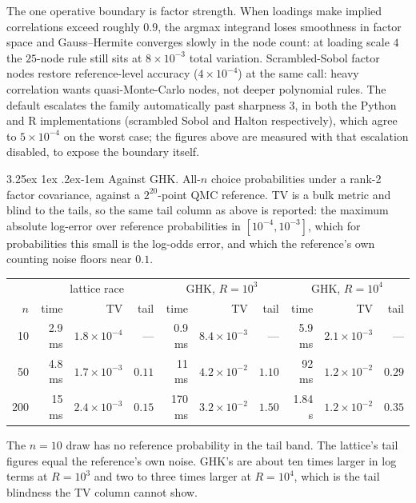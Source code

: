 \documentclass[11pt]{article}
\makeatletter
\renewcommand\paragraph{\@startsection{paragraph}{4}{\z@}%
  {3.25ex \@plus1ex \@minus.2ex}{-1em}%
  {\normalfont\normalsize\itshape}}
\makeatother
\begin{document}
The one operative boundary is factor strength. When loadings make implied
correlations exceed roughly $0.9$, the argmax integrand loses smoothness in
factor space and Gauss--Hermite converges slowly in the node count: at
loading scale $4$ the $25$-node rule still sits at $8\times10^{-3}$ total
variation. Scrambled-Sobol factor nodes restore reference-level accuracy
($4\times10^{-4}$) at the same call: heavy correlation wants
quasi-Monte-Carlo nodes, not deeper polynomial rules. The default
escalates the family automatically past sharpness $3$, in both the Python
and R implementations (scrambled Sobol and Halton respectively), which
agree to $5\times10^{-4}$ on the worst case; the figures above are
measured with that escalation disabled, to expose the boundary itself.

\paragraph{Against GHK.} All-$n$ choice probabilities under a rank-2 factor
covariance, against a $2^{20}$-point QMC reference. TV is a bulk metric and
blind to the tails, so the same tail column as above is reported: the
maximum absolute log-error over reference probabilities in
$[10^{-4},10^{-3}]$, which for probabilities this small is the log-odds
error, and which the reference's own counting noise floors near $0.1$.

\begin{center}\small
\setlength{\tabcolsep}{4pt}
\begin{tabular}{rrrrrrrrrr}
\toprule
& \multicolumn{3}{c}{lattice race} & \multicolumn{3}{c}{GHK, $R=10^3$} & \multicolumn{3}{c}{GHK, $R=10^4$}\\
$n$ & time & TV & tail & time & TV & tail & time & TV & tail\\
\midrule
10  & 2.9 ms & $1.8\times10^{-4}$ & --- & 0.9 ms & $8.4\times10^{-3}$ & --- & 5.9 ms & $2.1\times10^{-3}$ & ---\\
50  & 4.8 ms & $1.7\times10^{-3}$ & $0.11$ & 11 ms & $4.2\times10^{-2}$ & $1.10$ & 92 ms & $1.2\times10^{-2}$ & $0.29$\\
200 & 15 ms  & $2.4\times10^{-3}$ & $0.15$ & 170 ms & $3.2\times10^{-2}$ & $1.50$ & 1.84 s & $1.2\times10^{-2}$ & $0.35$\\
\bottomrule
\end{tabular}
\end{center}

The $n=10$ draw has no reference probability in the tail band. The
lattice's tail figures equal the reference's own noise. GHK's are about
ten times larger in log terms at $R=10^3$ and two to three times larger
at $R=10^4$, which is the
tail blindness the TV column cannot show.
\end{document}
